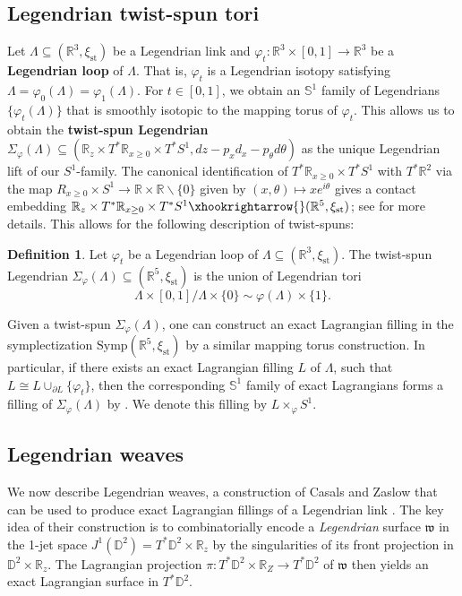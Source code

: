 \documentclass[11pt]{amsart}
\newcommand{\La}{\Lambda}
\newcommand{\R}{\mathbb{R}}
\newcommand{\st}{\text{st}}
\newcommand{\Symp}{\text{Symp}}
\newcommand{\w}{\mathfrak{w}}
\newcommand{\D}{\mathbb{D}}
\renewcommand{\S}{\mathbb{S}}
\theoremstyle{plain}
\theoremstyle{definition}
\newtheorem{definition}[theorem]{Definition}
\begin{document}
\subsection{Legendrian twist-spun tori}
Let $\La\subseteq (\R^3, \xi_{\st})$ be a Legendrian link and $\varphi_t:\R^3\times [0, 1]\to \R^3$ be a {\bf Legendrian loop} of $\La$. That is, $\varphi_t$ is a Legendrian isotopy satisfying $\La=\varphi_0(\La)=\varphi_1(\La)$. For $t\in [0, 1]$, we obtain an $\S^1$ family of Legendrians $\{\varphi_t(\La)\}$ that is smoothly isotopic to the mapping torus of $\varphi_t$. This allows us to obtain the {\bf twist-spun Legendrian} $\Sigma_\varphi(\La)\subseteq (\R_z\times T^*\R_{x\geq 0}\times T^*S^1, dz-p_x d_x - p_\theta d\theta)$ as the unique Legendrian lift of our $S^1$-family. The canonical identification of $T^*\R_{x\geq 0}\times T^*S^1$ with $T^*\R^2$ via the map $R_{x\geq 0}\times S^1\to \R\times\R\backslash \{0\}$ given by $(x, \theta)\mapsto xe^{i\theta}$ gives a contact embedding $\R_z\times T^*\R_{x\geq 0}\times T^*S^1 \xhookrightarrow{} (\R^5, \xi_{\st})$; see \cite[Section 1.3]{DRG21} for more details. This allows for the following description of twist-spuns:

\begin{definition}
    Let $\varphi_t$ be a Legendrian loop of $\La\subseteq (\R^3, \xi_{\st})$. The twist-spun Legendrian $\Sigma_\varphi(\La)\subseteq (\R^5, \xi_{\st})$ is the union of Legendrian tori $$\La\times[0,1]/\La\times\{0\}\sim \varphi(\La)\times\{1\}.$$
\end{definition}




Given a twist-spun $\Sigma_\varphi(\La)$, one can construct an exact Lagrangian filling in the symplectization $\Symp(\R^5, \xi_{\st})$ by a similar mapping torus construction. In particular, if there exists an exact Lagrangian filling $L$ of $\La$, such that $L\cong L\cup_{\partial L} \{\varphi_t\}$, then the corresponding $\S^1$ family of exact Lagrangians forms a filling of $\Sigma_\varphi(\La)$ by \cite[Proposition 6.2]{HughesRoy}. We denote this filling by $L\times_\varphi S^1$. 

\subsection{Legendrian weaves}\label{sec:weaves}

We now describe Legendrian weaves, a construction of Casals and Zaslow that can be used to produce exact Lagrangian fillings of a Legendrian link \cite{CZ2022}. The key idea of their construction is to combinatorially encode a {\it Legendrian} surface $\w$ in the 1-jet space $J^1(\D^2)=T^*\D^2\times \R_z$ by the singularities of its front projection in $\D^2\times \R_z$. The Lagrangian projection $\pi:T^*\D^2\times \R_Z\to T^*\D^2$ of $\w$ then yields an exact Lagrangian surface in $T^*\D^2$.
\end{document}
